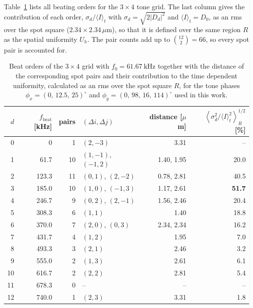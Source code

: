 Table~\ref{tab:beat34} lists all beating orders for the $3\times4$ tone grid.
The last column gives the contribution of each order,
$\sigma_d/\langle I\rangle_t$ with $\sigma_d=\sqrt{2|D_d|^2}$ and
$\langle I\rangle_t=D_0$, as an rms over the spot square
($2.34\times2.34\,\mu$m), so that it is defined over the same region $R$ as the
spatial uniformity $U_h$. The pair counts add up to
$\binom{12}{2}=66$, so every spot pair is accounted for.

\begin{table}[h]
\centering
\small
\begin{tabular}{rrrlrr}
\hline
$d$ & $f_{\text{beat}}$ [kHz] & pairs & $(\Delta i,\Delta j)$ & distance [$\mu$m]
 & $\left\langle\sigma_d^2/\langle I\rangle_t^2\right\rangle_R^{1/2}$ [\%]\\ \hline
0  & 0     & 1  & $(2,-3)$           & 3.31       & --\\
1  & 61.7  & 10 & $(1,-1)$, $(-1,2)$ & 1.40, 1.95 & 20.0\\
2  & 123.3 & 11 & $(0,1)$, $(2,-2)$  & 0.78, 2.81 & 40.5\\
3  & 185.0 & 10 & $(1,0)$, $(-1,3)$  & 1.17, 2.61 & \textbf{51.7}\\
4  & 246.7 & 9  & $(0,2)$, $(2,-1)$  & 1.56, 2.46 & 20.4\\
5  & 308.3 & 6  & $(1,1)$            & 1.40       & 18.8\\
6  & 370.0 & 7  & $(2,0)$, $(0,3)$   & 2.34, 2.34 & 16.2\\
7  & 431.7 & 4  & $(1,2)$            & 1.95       &  7.0\\
8  & 493.3 & 3  & $(2,1)$            & 2.46       &  3.2\\
9  & 555.0 & 2  & $(1,3)$            & 2.61       &  6.1\\
10 & 616.7 & 2  & $(2,2)$            & 2.81       &  5.4\\
11 & 678.3 & 0  & --                 & --         & --\\
12 & 740.0 & 1  & $(2,3)$            & 3.31       &  1.8\\
\hline
\end{tabular}
\caption{Beat orders of the $3\times4$ grid with $f_0=\SI{61.67}{\kilo\hertz}$
together with the distance of the corresponding spot pairs and their
contribution to the time dependent uniformity, calculated as an rms over the
spot square $R$, for the tone phases $\phi_x=(0,\,12.5,\,25)^\circ$ and
$\phi_y=(0,\,98,\,16,\,114)^\circ$ used in this work.}
\label{tab:beat34}
\end{table}

